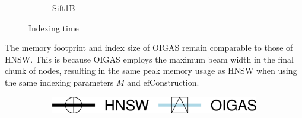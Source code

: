 \begin{figure}[htbp]
\begin{subfigure}[b]{0.3\textwidth}
        \caption{Sift1B}
        \label{fig:oigasidx:1Bsift_Time}
    \end{subfigure}

    \caption{Indexing time}
    \label{fig:oigas_vs_hnsw_indexing}
\end{figure}

The memory footprint and index size of OIGAS remain comparable to those of HNSW. This is because OIGAS employs the maximum beam width in the final chunk of nodes, resulting in the same peak memory usage as HNSW when using the same indexing parameters \( M \) and \( \text{efConstruction} \).


\begin{figure}[htbp]
    \centering
    \captionsetup{justification=centering}
	\centering

		\captionsetup{justification=centering}
		\captionsetup[subfigure]{justification=centering}
        \begin{subfigure}[b]{\textwidth}
        \centering
 		\includegraphics[width=0.3\columnwidth]{../img/oigas/Search/legend.png}
    \end{subfigure}
    

\end{figure}
